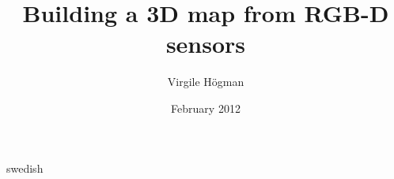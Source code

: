 \documentclass[a4paper,11pt]{kth-mag}
\title{Building a 3D map from RGB-D sensors}
\author{Virgile H\"{o}gman}
\date{February 2012}
\begin{document}
\frontmatter
\pagestyle{empty}
\removepagenumbers
\maketitle

\clearpage
{}
\begin{abstract}

\end{abstract}
\clearpage
\begin{foreignabstract}{swedish}

\end{foreignabstract}
\clearpage


\cleardoublepage
\tableofcontents



\mainmatter

\pagestyle{newchap}


\clearpage
{}
\printglossaries


\cleardoublepage
\renewcommand{\bibname}{References}

%  

\end{document}
